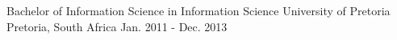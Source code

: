 \begin{cventries}
  \cventry
    {Bachelor of Information Science in Information Science} %
    {University of Pretoria} %
    {Pretoria, South Africa} %
    {Jan. 2011 - Dec. 2013} %
    {}
\end{cventries}
